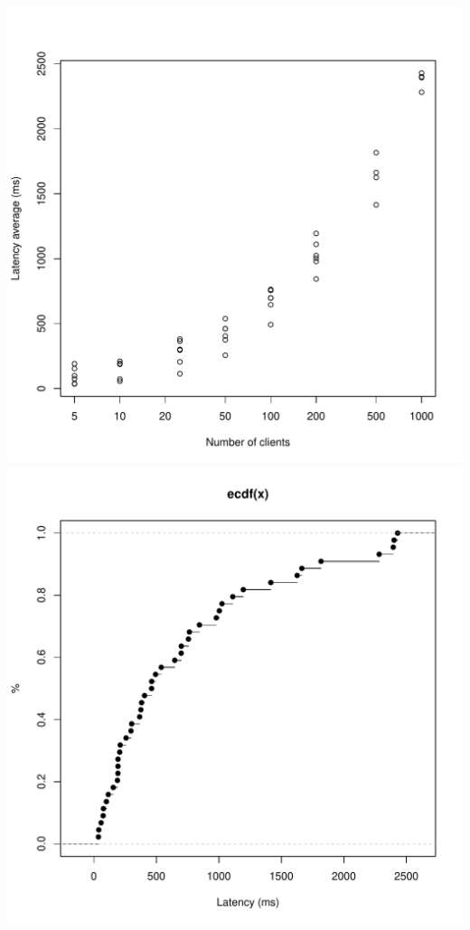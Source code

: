 \documentclass[11pt]{article}
\begin{document}
\begin{center}
\includegraphics[scale=0.6]{avgs.pdf}
\\
\includegraphics[scale=0.6]{cdf.pdf}
\end{center}
\end{document}
